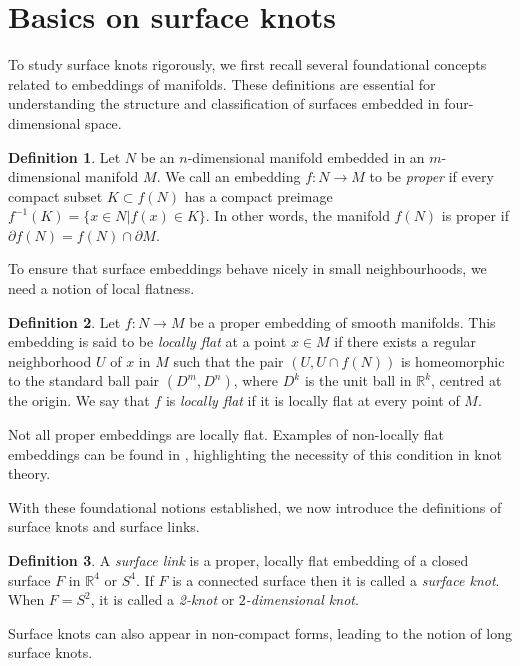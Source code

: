 \documentclass[10pt,a4paper,reqno]{amsart}
\theoremstyle{definition}
\newtheorem{definition}{Definition}[section]
\theoremstyle{remark}
\newcommand{\R}{\mathbb R}
\begin{document}
\section{Basics on surface knots}\label{sec:surface}

  To study surface knots rigorously, we first recall several foundational concepts related to embeddings of manifolds. These definitions are essential for understanding the structure and classification of surfaces embedded in four-dimensional space.


\begin{definition}
	
	Let $N$ be an $n$-dimensional manifold embedded in an $m$-dimensional manifold $M$. We call an embedding $f:N \rightarrow M$ to be {\it proper} if every compact subset $K \subset f(N)$ has a compact preimage $f^{-1}(K)=\{x \in N \vert f(x) \in K\}$. In other words, the manifold $f(N)$ is proper if $\partial f(N)= f(N) \cap \partial M$.
\end{definition}

 To ensure that surface embeddings behave nicely in small neighbourhoods, we need a notion of local flatness.
\begin{definition}
	Let $f:N\to M$ be a proper embedding of smooth manifolds. This embedding is said to be 
  {\it  locally flat}  at a point $x \in M$ if there exists a regular neighborhood $U$ of $x$ in $M$ such that the pair $(U,U \cap f(N))$ is homeomorphic to the standard ball pair $(D^{m},D^{n})$, where $D^{k}$ is the unit ball in $\R^{k}$, centred at the origin.
	We say that $f$ is {\it locally flat} if it is locally flat at every point of $M$.
\end{definition}

 Not all proper embeddings are locally flat. Examples of non-locally flat embeddings can be found in \cite{Kam}, highlighting the necessity of this condition in knot theory.
 
 
With these foundational notions established, we now introduce the definitions of surface knots and surface links.
\begin{definition}
	A {\it surface link} is a proper, locally flat embedding of a closed surface $F$ in $\R^{4}$ or $S^{4}$.  If $F$ is a connected surface then it is called a {\it surface knot}. When $F=S^{2}$, it is called a {\it 2-knot} or {\it $2$-dimensional knot}.
	
\end{definition}


 Surface knots can also appear in non-compact forms, leading to the notion of long surface knots.
\end{document}
